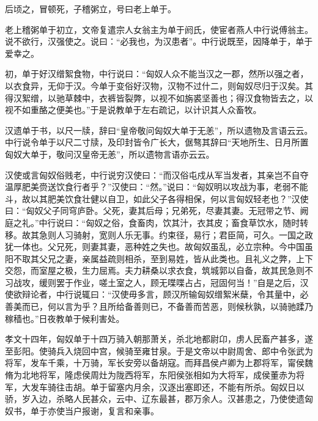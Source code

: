 \documentclass[12pt,UTF8]{ctexbook}
\begin{document}
后顷之，冒顿死，子稽粥立，号曰老上单于。



老上稽粥单于初立，文帝复遣宗人女翁主为单于阏氏，使宦者燕人中行说傅翁主。说不欲行，汉强使之。说曰：“必我也，为汉患者”。中行说既至，因降单于，单于爱幸之。



初，单于好汉缯絮食物，中行说曰：“匈奴人众不能当汉之一郡，然所以强之者，以衣食异，无仰于汉。今单于变俗好汉物，汉物不过什二，则匈奴尽归于汉矣。其得汉絮缯，以驰草棘中，衣裤皆裂弊，以视不如旃裘坚善也；得汉食物皆去之，以视不如重酪之便美也。”于是说教单于左右疏记，以计识其人众畜牧。



汉遗单于书，以尺一牍，辞曰“皇帝敬问匈奴大单于无恙”，所以遗物及言语云云。中行说令单于以尺二寸牍，及印封皆令广长大，倨骜其辞曰“天地所生、日月所置匈奴大单于，敬问汉皇帝无恙”，所以遗物言语亦云云。



汉使或言匈奴俗贱老，中行说穷汉使曰：“而汉俗屯戍从军当发者，其亲岂不自夺温厚肥美赍送饮食行者乎？”汉使曰：“然。”说曰：“匈奴明以攻战为事，老弱不能斗，故以其肥美饮食壮健以自卫，如此父子各得相保，何以言匈奴轻老也？”汉使曰：“匈奴父子同穹庐卧。父死，妻其后母；兄弟死，尽妻其妻。无冠带之节、阙庭之礼。”中行说曰：“匈奴之俗，食畜肉，饮其汁，衣其皮；畜食草饮水，随时转移。故其急则人习骑射，宽则人乐无事。约束径，易行；君臣简，可久。一国之政犹一体也。父兄死，则妻其妻，恶种姓之失也。故匈奴虽乱，必立宗种。今中国虽阳不取其父兄之妻，亲属益疏则相杀，至到易姓，皆从此类也。且礼义之弊，上下交怨，而室屋之极，生力屈焉。夫力耕桑以求衣食，筑城郭以自备，故其民急则不习战攻，缓则罢于作业，嗟土室之人，顾无喋喋占占，冠固何当！”自是之后，汉使欲辩论者，中行说辄曰：“汉使毋多言，顾汉所输匈奴缯絮米蘖，令其量中，必善美而已，何以言为乎？且所给备善则已，不备善而苦恶，则候秋孰，以骑驰蹂乃稼穑也。”日夜教单于候利害处。



孝文十四年，匈奴单于十四万骑入朝那萧关，杀北地都尉卬，虏人民畜产甚多，遂至彭阳。使骑兵入烧回中宫，候骑至雍甘泉。于是文帝以中尉周舍、郎中令张武为将军，发车千乘，十万骑，军长安旁以备胡寇。而拜昌侯卢卿为上郡将军，甯侯魏脩为北地将军，隆虑侯周灶为陇西将军，东阳侯张相如为大将军，成侯董赤为将军，大发车骑往击胡。单于留塞内月余，汉逐出塞即还，不能有所杀。匈奴日以骄，岁入边，杀略人民甚众，云中、辽东最甚，郡万余人。汉甚患之，乃使使遗匈奴书，单于亦使当户报谢，复言和亲事。
\end{document}
